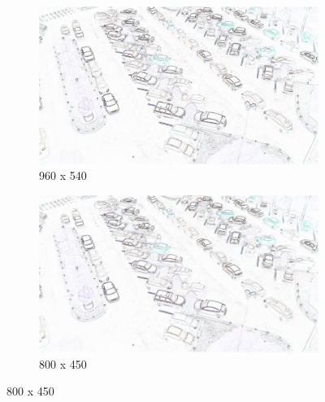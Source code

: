 \begin{appendix}
\begin{figure}[H]
    \bigskip
    \begin{subfigure}{.5\textwidth}
        \centering
        \includegraphics[width=.85\linewidth]{img/conception/image_process/edge-downsample/5.png}
        \caption{960 x 540}   
    \end{subfigure}%
    \begin{subfigure}{.5\textwidth}
        \centering
        \includegraphics[width=.85\linewidth]{img/conception/image_process/edge-downsample/4.png}
        \caption{800 x 450}
    \end{subfigure}%


\end{figure}
\end{appendix}
